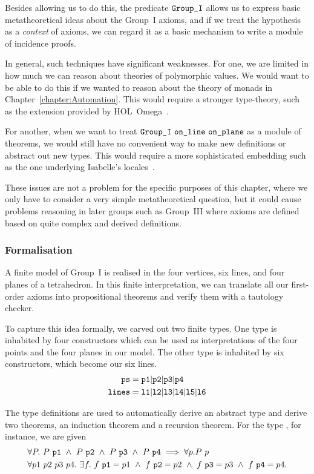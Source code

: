Besides allowing us to do this, the predicate $\texttt{Group\_I}$ allows us to express basic metatheoretical ideas about the Group~I axioms, and if we treat the hypothesis as a \emph{context} of axioms, we can regard it as a basic mechanism to write a module of incidence proofs. 

In general, such techniques have significant weaknesses. For one, we are limited in how much we can reason about theories of polymorphic values. We would want to be able to do this if we wanted to reason about the theory of monads in Chapter~\ref{chapter:Automation}. This would require a stronger type-theory, such as the extension provided by HOL~Omega~\cite{HOLOmega}.

For another, when we want to treat $\code{Group\_I}\ \code{on\_line}\ \code{on\_plane}$ as a module of theorems, we would still have no convenient way to make new definitions or abstract out new types. This would require a more sophisticated embedding such as the one underlying Isabelle's locales~\cite{IsabelleLocales}.

These issues are not a problem for the specific purposes of this chapter, where we only have to consider a very simple metatheoretical question, but it could cause problems reasoning in later groups such as Group~III where axioms are defined based on quite complex and derived definitions.

\subsubsection{Formalisation}
A finite model of Group~I is realised in the four vertices, six lines, and four planes of a tetrahedron. In this finite interpretation, we can translate all our first-order axioms into propositional theorems and verify them with a tautology checker.

To capture this idea formally, we carved out two finite types. One type is inhabited by four constructors which can be used as interpretations of the four points and the four planes in our model. The other type is inhabited by six constructors, which become our six lines.
\begin{align*}
\texttt{ps}   &= \texttt{p1} \vert \texttt{p2} \vert\texttt{p3} \vert\texttt{p4}\\
\texttt{lines}&= \texttt{l1} \vert \texttt{l2} \vert\texttt{l3} \vert\texttt{l4} \vert\texttt{l5} \vert\texttt{l6}\\
\end{align*}

The type definitions are used to automatically derive an abstract type and derive two theorems, an induction theorem and a recursion theorem. For the type , for instance, we are given
\begin{align*}
&\forall P.\ P\ \code{p1}\ \wedge\ P\ \code{p2}\ \wedge\ P\ \code{p3}\ \wedge\ P\ \code{p4}\implies\forall p. P\ p\\
&\forall p1\ p2\ p3\ p4.\ \exists f.\ f\ \code{p1} = p1\ \wedge\ f\ \code{p2} = p2\ \wedge\ f\ \code{p3} = p3\ \wedge\ f\ \code{p4} = p4.
\end{align*}

